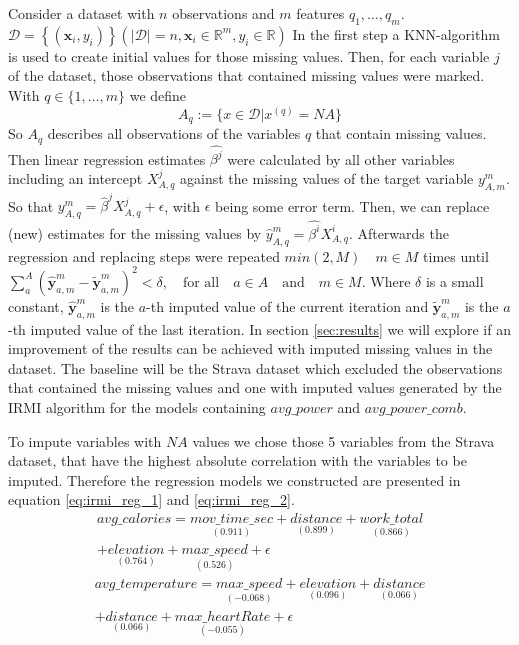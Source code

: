 \documentclass[12pt,a4paper]{article}
\begin{document}
Consider a dataset with \(n\) observations and \(m\) features \(q_1,\ldots,q_m\). \(\mathcal{D}=\left\{\left(\mathbf{x}_{i}, y_{i}\right)\right\}\left(|\mathcal{D}|=n, \mathbf{x}_{i} \in \mathbb{R}^{m}, y_{i} \in \mathbb{R}\right)\)
In the first step a KNN-algorithm is used to create initial values for those missing values. Then, for each variable \(j\) of the dataset, those observations that contained missing values were marked.
With \(q \in \{1,\ldots,m\}\) we define
\begin{equation}
A_q :=\{ x \in \mathcal{D} | x^{(q)} = NA\}
\end{equation}
So \(A_q\) describes all observations of the variables \(q\) that contain missing values. Then linear regression estimates \(\hat{\beta^j}\) were calculated by all other variables including an intercept \(X_{A, q}^j\) against the missing values of the target variable \(y_{A, m}^m\). So that \(y_{A, q}^m = \hat{\beta}^jX_{A, q}^j + \epsilon\), with \(\epsilon\) being some error term. Then, we can replace (new) estimates for the missing values by \(\hat{y}_{A, q}^m = \hat{\beta^i}X_{A, q}^i\). Afterwards the regression and replacing steps were repeated \(min(2,M) \quad m \in M\) times until \(\sum_{a}^A\left(\hat{\boldsymbol{y}}_{a, m}^{m}-\tilde{\boldsymbol{y}}_{a, m}^{m}\right)^{2}<\delta, \quad \text {for all} \quad a \in A \quad \text {and} \quad m \in M\). Where \(\delta\) is a small constant, \(\hat{\boldsymbol{y}}_{a, m}^{m}\) is the \(a\)-th imputed value of the current iteration and \(\tilde{\boldsymbol{y}}_{a, m}^{m}\) is the \(a\)-th imputed value of the last iteration. In section \ref{sec:results} we will explore if an improvement of the results can be achieved with imputed missing values in the dataset. The baseline will be the Strava dataset which excluded the observations that contained the missing values and one with imputed values generated by the IRMI algorithm for the models containing \(avg\_power\) and \(avg\_power\_comb\).

To impute variables with \(NA\) values we chose those 5 variables from the Strava dataset, that have the highest absolute correlation with the variables to be imputed. Therefore the regression models we constructed are presented in equation \ref{eq:irmi_reg_1} and \ref{eq:irmi_reg_2}.
\begin{equation}
 \begin{aligned}
 avg\_calories = \underset{(0.911)}{mov\_time\_sec} + \underset{(0.899)}{distance} + \underset{(0.866)}{work\_total} \\  + \underset{(0.764)}{elevation} + \underset{(0.526)}{max\_speed} + \epsilon 
 \end{aligned}
 \label{eq:irmi_reg_1}
 \end{equation}
\begin{equation}
 \begin{aligned}
  avg\_temperature = \underset{(-0.068)}{max\_speed}+\underset{(0.096)}{elevation}+\underset{(0.066)}{distance}  \\ + \underset{(0.066)}{distance}+\underset{(-0.055)}{max\_heartRate} + \epsilon 
 \end{aligned}
 \label{eq:irmi_reg_2}
 \end{equation}
\end{document}

